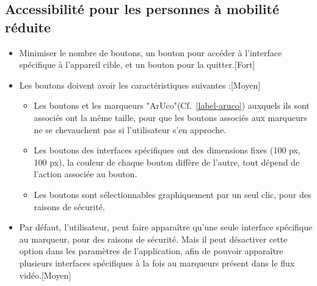 \documentclass[12pt,a4paper]{article}
\begin{document}
\subsection{Accessibilité pour les personnes à mobilité réduite}
\begin{itemize}
\item Minimiser le nombre de boutons, un bouton pour accéder à l'interface spécifique à l'appareil cible, et un bouton pour la quitter.[Fort]
\item Les boutons doivent avoir les caractéristiques suivantes :[Moyen]
\begin{itemize}
\item Les boutons et les marqueurs "ArUco"(Cf.~\ref{label-aruco}) auxquels ils sont associés ont la même taille, pour que les boutons associés aux marqueurs ne se chevauchent pas si l'utilisateur s'en approche.

\item Les boutons des interfaces spécifiques ont des dimensions fixes (100 px, 100 px), la couleur de chaque bouton diffère de l'autre, tout dépend de l'action associée au bouton.

\item Les boutons sont sélectionnables graphiquement par un seul clic, pour des raisons de sécurité.
\end{itemize}
\item Par défaut, l'utilisateur, peut faire apparaître qu'une seule interface spécifique au marqueur, pour des raisons de sécurité. Mais il peut désactiver cette option dans les paramètres de l'application, afin de pouvoir apparaître plusieurs interfaces spécifiques à la fois au marqueurs présent dans le flux vidéo.[Moyen]
\end{itemize}

\end{document}
